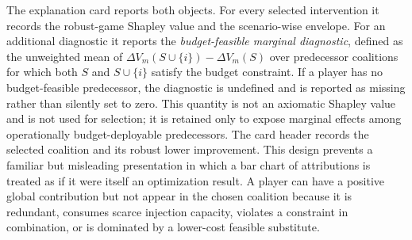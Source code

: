 \documentclass[review]{elsarticle}
\theoremstyle{plain}
\theoremstyle{definition}
\theoremstyle{remark}
\newcommand{\Utility}{V}
\begin{document}
\begin{center}
\end{center}

The explanation card reports both objects. For every selected intervention it records the robust-game Shapley value and the scenario-wise envelope. For an additional diagnostic it reports the \emph{budget-feasible marginal diagnostic}, defined as the unweighted mean of $\Delta\Utility_m(S\cup\{i\})-\Delta\Utility_m(S)$ over predecessor coalitions for which both $S$ and $S\cup\{i\}$ satisfy the budget constraint. If a player has no budget-feasible predecessor, the diagnostic is undefined and is reported as missing rather than silently set to zero. This quantity is not an axiomatic Shapley value and is not used for selection; it is retained only to expose marginal effects among operationally budget-deployable predecessors. The card header records the selected coalition and its robust lower improvement. This design prevents a familiar but misleading presentation in which a bar chart of attributions is treated as if it were itself an optimization result. A player can have a positive global contribution but not appear in the chosen coalition because it is redundant, consumes scarce injection capacity, violates a constraint in combination, or is dominated by a lower-cost feasible substitute.
\end{document}
